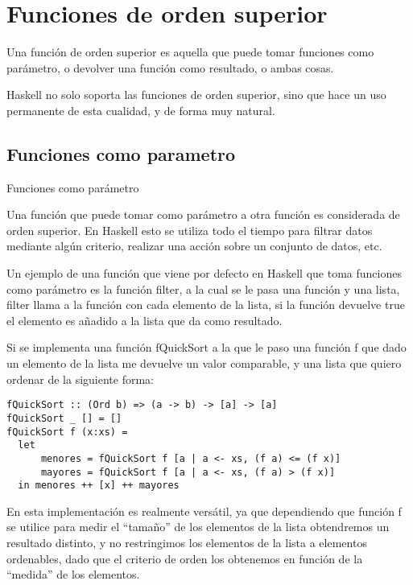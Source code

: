 
\section{Funciones de orden superior} %
\label{sec:functiones_de_orden_superior}


Una función de orden superior es aquella que puede tomar funciones como parámetro, o devolver una función como resultado, o ambas cosas.

Haskell no solo soporta las funciones de orden superior, sino que hace un uso permanente de esta cualidad, y de forma muy natural.


\subsection{Funciones como parametro} %
\label{sub:funciones_como_parametro}

Funciones como parámetro

Una función que puede tomar como parámetro a otra función es considerada de orden superior. En Haskell esto se utiliza todo el tiempo para filtrar datos mediante algún criterio, realizar una acción sobre un conjunto de datos, etc.

Un ejemplo de una función que viene por defecto en Haskell que toma funciones como parámetro es la función filter, a la cual se le pasa una función y una lista, filter llama a la función con cada elemento de la lista, si la función devuelve true el elemento es añadido a la lista que da como resultado.

Si se implementa una función fQuickSort a la que le paso una función f que dado un elemento de la lista me devuelve un valor comparable, y una lista que quiero ordenar de la siguiente forma:

\begin{lstlisting}
fQuickSort :: (Ord b) => (a -> b) -> [a] -> [a]
fQuickSort _ [] = []
fQuickSort f (x:xs) =
  let
      menores = fQuickSort f [a | a <- xs, (f a) <= (f x)]
      mayores = fQuickSort f [a | a <- xs, (f a) > (f x)]
  in menores ++ [x] ++ mayores
\end{lstlisting}

En esta implementación es realmente versátil, ya que dependiendo que función f se utilice para medir el “tamaño” de los elementos de la lista obtendremos un resultado distinto, y no restringimos los elementos de la lista a elementos ordenables, dado que el criterio de orden los obtenemos en función de la “medida” de los elementos.

